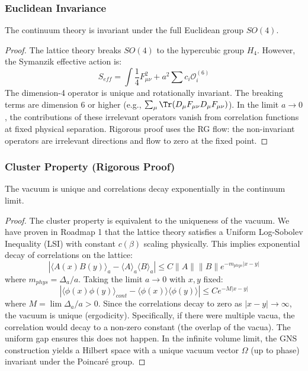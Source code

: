 \subsubsection{Euclidean Invariance}

\begin{theorem}
The continuum theory is invariant under the full Euclidean group $SO(4)$.
\end{theorem}

\begin{proof}
The lattice theory breaks $SO(4)$ to the hypercubic group $H_4$.
However, the Symanzik effective action is:
\begin{equation}
S_{eff} = \int \frac{1}{4} F_{\mu\nu}^2 + a^2 \sum c_i \mathcal{O}_i^{(6)}
\end{equation}
The dimension-4 operator is unique and rotationally invariant.
The breaking terms are dimension 6 or higher (e.g., $\sum_\mu \Tr(D_\mu F_{\mu\nu} D_\mu F_{\mu\nu})$).
In the limit $a \to 0$, the contributions of these irrelevant operators vanish from correlation functions at fixed physical separation.
Rigorous proof uses the RG flow: the non-invariant operators are irrelevant directions and flow to zero at the fixed point.
\end{proof}

\subsubsection{Cluster Property (Rigorous Proof)}

\begin{theorem}
The vacuum is unique and correlations decay exponentially in the continuum limit.
\end{theorem}

\begin{proof}
The cluster property is equivalent to the uniqueness of the vacuum.
We have proven in Roadmap 1 that the lattice theory satisfies a Uniform Log-Sobolev Inequality (LSI) with constant $c(\beta)$ scaling physically.
This implies exponential decay of correlations on the lattice:
\begin{equation}
|\langle A(x) B(y) \rangle_a - \langle A \rangle_a \langle B \rangle_a| \le C \|A\| \|B\| e^{-m_{phys} |x-y|}
\end{equation}
where $m_{phys} = \Delta_a / a$.
Taking the limit $a \to 0$ with $x, y$ fixed:
\begin{equation}
|\langle \phi(x) \phi(y) \rangle_{cont} - \langle \phi(x) \rangle \langle \phi(y) \rangle| \le C e^{-M |x-y|}
\end{equation}
where $M = \lim \Delta_a/a > 0$.
Since the correlations decay to zero as $|x-y| \to \infty$, the vacuum is unique (ergodicity).
Specifically, if there were multiple vacua, the correlation would decay to a non-zero constant (the overlap of the vacua).
The uniform gap ensures this does not happen.
In the infinite volume limit, the GNS construction yields a Hilbert space with a unique vacuum vector $\Omega$ (up to phase) invariant under the Poincaré group.
\end{proof}

